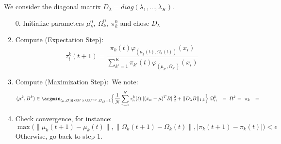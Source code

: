 We consider the diagonal matrix $D_{\lambda}=diag(\lambda_1,\dots,\lambda_K)$.

\begin{enumerate}
	\item[0.] Initialize parameters $\mu_k^0,\; \Omega_k^0,\;\pi_k^0$ and chose $D_{\lambda}$
	\item Compute (Expectation Step):
	      \begin{equation}
	      	\tau_i^k(t+1)=\frac{\pi_k(t) \varphi_{(\mu_k(t),\Omega_k(t))}(x_i)}{\sum_{k'=1}^K\pi_{k'}(t)\varphi_{(\mu_{k'},\Omega_{k'})}(x_i)}
	      \end{equation}
	\item Compute (Maximization Step):\
	      We note:
	      \begin{align}
	      	(\mu^k,B^k)   & \in \argmin_{(\mu,B)\in \RR^p \times \RR^{p\times p},B_{jj}=1}\Big\{\frac{1}{N}\sum_{n=1}^N\tau_n^k(t)||(x_n-\mu)^TB||^2_2+||D_{\lambda}B||_{1,1}\Big\} \
	      	\Omega^k_{ii} & =                                                                                                                                                       \
	      	\Omega^k      & =                                                                                                                                                       \
	      	\pi_k         & =
	      \end{align}
	\item Check convergence, for instance:\
	      $\max\Big(\|\mu_k(t+1)-\mu_k(t)\|,\|\Omega_k(t+1)-\Omega_k(t)\|,|\pi_k(t+1)-\pi_k(t)|\Big)<\epsilon$
	      Otherwise, go back to step 1.
\end{enumerate}

\item
